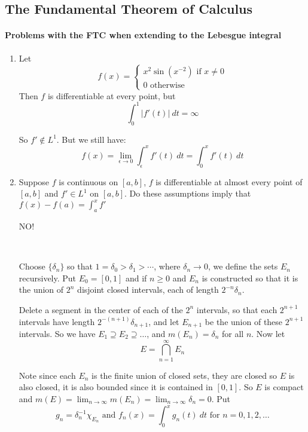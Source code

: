 \subsection{The Fundamental Theorem of Calculus}
\paragraph*{Problems with the FTC when extending to the Lebesgue integral}
\begin{enumerate}[label = (\alph*)]
    \item Let \[
        f(x) = \begin{cases}
            x^2\sin(x^{-2}) \text{ if }x\neq 0\\
            0 \text{ otherwise}
        \end{cases}    
    \]
    Then $f$ is differentiable at every point, but\[
        \int_0^1 |f'(t)|~dt =\infty    
    \]

    So $f'\not\in L^1$. But we still have:\[
        f(x) = \lim_{\epsilon\rightarrow 0}\int_\epsilon^x f'(t)~dt = \int_0^x f'(t)~dt    
    \]

    \item Suppose $f$ is continuous on $[a,b]$, $f$ is differentiable at almost every point of $[a,b]$ and $f'\in L^1$ on $[a,b]$. Do these assumptions imply that $f(x) - f(a) = \int_a^x f'$
    
    \textsc{NO!}

    \

    Choose $\{\delta_n\}$ so that $1 = \delta_0>\delta_1>\cdots$, where $\delta_n\rightarrow 0$, we define the sets $E_n$ recursively. Put $E_0 = [0,1]$ and if $n\geq 0$ and $E_n$ is constructed so that it is the union of $2^n$ disjoint closed intervals, each of length $2^{-n}\delta_n$. 
    
    Delete a segment in the center of each of the $2^n$ intervals, so that each $2^{n+1}$ intervals have length $2^{-(n+1)}\delta_{n+1}$, and let $E_{n+1}$ be the union of these $2^{n+1}$ intervals. So we have $E_1\supseteq E_2\supseteq \ldots$, and $m(E_n) = \delta_n$ for all $n$. Now let\[
        E = \bigcap_{n=1}^\infty E_n    
    \]

    Note since each $E_n$ is the finite union of closed sets, they are closed so $E$ is also closed, it is also bounded since it is contained in $[0,1]$. So $E$ is compact and $m(E) = \lim_{n\rightarrow \infty}m(E_n) = \lim_{n\rightarrow \infty}\delta_n = 0$. Put \[
        g_n = \delta_n^{-1}\chi_{E_n} \text{ and } f_n(x) = \int_0^x g_n(t)~dt \text{ for }n=0,1,2,\ldots    
    \]


\end{enumerate}
